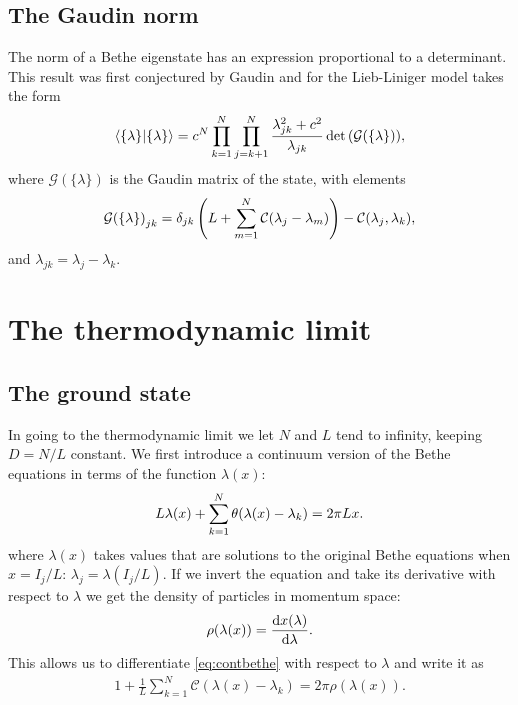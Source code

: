 \documentclass[11pt, a4paper]{report} %
\begin{document}
\subsection{The Gaudin norm}
The norm of a Bethe eigenstate has an expression proportional to a determinant.
This result was first conjectured by Gaudin and for the Lieb-Liniger model takes the form~\cite{Caux2007}
\begin{align}
  \braket{\{\lambda\}}{\{\lambda\}} = c^N \prod_{k=1}^N \prod_{j=k+1}^N \frac{\lambda_{jk}^2 + c^2}{\lambda_{jk}} \det\qty(\mathcal{G}\qty(\{\lambda\})),
\end{align}
where $\mathcal{G}(\{\lambda\})$ is the Gaudin matrix of the state, with elements
\begin{align}\label{eq:gaudin}
  \mathcal{G}{(\{\lambda\})}_{jk} = \delta_{jk} \left(L + \sum_{m=1}^{N}\mathcal{C}\qty(\lambda_j-\lambda_m)\right) - \mathcal{C}\qty(\lambda_j, \lambda_k),
\end{align}
and \(\lambda_{jk} = \lambda_j-\lambda_k\).


\section{The thermodynamic limit}
\subsection{The ground state}
In going to the thermodynamic limit we let \(N\) and \(L\) tend to infinity, keeping \(D=N/L\) constant.
We first introduce a continuum version of the Bethe equations in terms of the function \(\lambda(x)\):
\begin{align}
  \label{eq:contbethe}
  L \lambda(x) + \sum_{k=1}^N\theta\qty(\lambda(x)-\lambda_k) = 2 \pi L x.
\end{align}
where \(\lambda(x)\) takes values that are solutions to the original Bethe equations when \(x=I_j/L\): \(\lambda_j=\lambda(I_j/L)\).
If we invert the equation and take its derivative with respect to \(\lambda\) we get the density of particles in momentum space:
\begin{align}
  \rho(\lambda(x)) = \frac{\dd x\qty(\lambda)}{\dd \lambda}.
\end{align}
This allows us to differentiate \cref{eq:contbethe} with respect to \(\lambda\) and write it as 
\begin{align}
  1+\frac{1}{L} \sum_{k=1}^{N} \mathcal{C}(\lambda(x)- \lambda_k) = 2\pi \rho(\lambda(x)).
\end{align}
\end{document}
